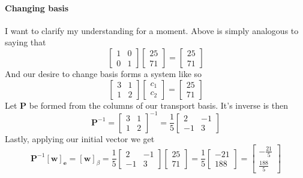 \documentclass{article}
\begin{document}
            \paragraph{Changing basis}
                I want to clarify my understanding for a moment. Above is simply
                analogous to saying that
                \[
                    \begin{bmatrix}1 & 0\\0 & 1\end{bmatrix}
                    \begin{bmatrix}25\\71\end{bmatrix}
                    =
                    \begin{bmatrix}25\\71\end{bmatrix}
                \]
                And our desire to change basis forms a system like so
                \[
                    \begin{bmatrix}3 & 1 \\ 1 & 2\end{bmatrix}
                    \begin{bmatrix}c_1\\c_2\end{bmatrix}
                    =
                    \begin{bmatrix}25\\71\end{bmatrix}
                \]
                Let $\mathbf{P}$ be formed from the columns of our transport basis.
                It's inverse is then
                \[
                    \mathbf{P}^{-1}
                    =
                    \begin{bmatrix}3 & 1 \\ 1 & 2\end{bmatrix}^{-1}
                    =
                    \frac{1}{5}
                    \begin{bmatrix}2 & -1 \\ -1 & 3\end{bmatrix}
                \]
                Lastly, applying our initial vector we get
                \[
                    \mathbf{P}^{-1}
                    \left[\mathbf{w}\right]_{\mathbf{e}}
                    =
                    \left[\mathbf{w}\right]_{\beta}
                    =
                    \frac{1}{5}
                    \begin{bmatrix}2 & -1 \\ -1 & 3\end{bmatrix}
                    \begin{bmatrix}25\\71\end{bmatrix}
                    =
                    \frac{1}{5}
                    \begin{bmatrix}-21\\188\end{bmatrix}
                    =
                    \begin{bmatrix}-\frac{21}{5}\\\frac{188}{5}\end{bmatrix}
                \]
\end{document}
